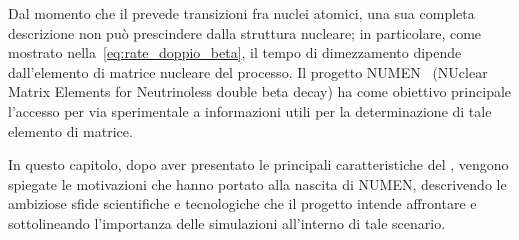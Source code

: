 %
%
%
Dal momento che il \doppiobeta{} prevede transizioni fra nuclei atomici, una sua completa descrizione non può prescindere dalla struttura nucleare; in particolare, come mostrato nella~\ref{eq:rate_doppio_beta}, il tempo di dimezzamento dipende dall'elemento di matrice nucleare del processo.
Il progetto NUMEN~\cite{cappuzzello:epja18} (NUclear Matrix Elements for Neutrinoless double beta decay) ha come obiettivo principale l'accesso per via sperimentale a informazioni utili per la determinazione di tale elemento di matrice.
 
In questo capitolo, dopo aver presentato le principali caratteristiche del \doppiobeta{}, vengono spiegate le motivazioni che hanno portato alla nascita di NUMEN, descrivendo le ambiziose sfide scientifiche e tecnologiche che il progetto intende affrontare e sottolineando l'importanza delle simulazioni all'interno di tale scenario.




\section{} \label{sez:doppio_beta_senza_neutrini}

